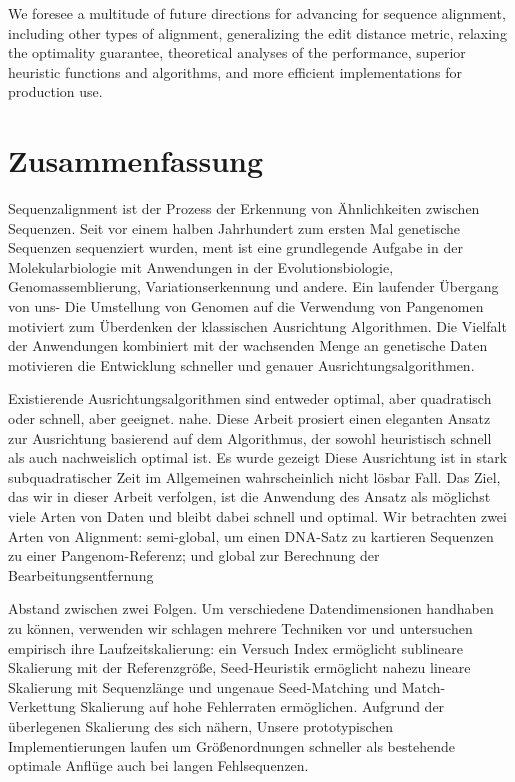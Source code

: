 We foresee a multitude of future directions for advancing \A for sequence
alignment, including other types of alignment, generalizing the edit distance
metric, relaxing the optimality guarantee, theoretical analyses of the
performance, superior heuristic functions and algorithms, and more efficient
implementations for production use.

\endgroup

\cleardoublepage%

\begingroup
\let\clearpage\relax
\let\cleardoublepage\relax
\let\cleardoublepage\relax

\chapter*{Zusammenfassung}

Sequenzalignment ist der Prozess der Erkennung von Ähnlichkeiten zwischen
Sequenzen. Seit vor einem halben Jahrhundert zum ersten Mal genetische Sequenzen
sequenziert wurden, ment ist eine grundlegende Aufgabe in der Molekularbiologie
mit Anwendungen in der Evolutionsbiologie, Genomassemblierung,
Variationserkennung und andere. Ein laufender Übergang von uns- Die Umstellung
von Genomen auf die Verwendung von Pangenomen motiviert zum Überdenken der
klassischen Ausrichtung Algorithmen. Die Vielfalt der Anwendungen kombiniert mit
der wachsenden Menge an genetische Daten motivieren die Entwicklung schneller
und genauer Ausrichtungsalgorithmen.

Existierende Ausrichtungsalgorithmen sind entweder optimal, aber quadratisch
oder schnell, aber geeignet. nahe. Diese Arbeit prosiert einen eleganten Ansatz
zur Ausrichtung basierend auf dem \A Algorithmus, der sowohl heuristisch schnell
als auch nachweislich optimal ist. Es wurde gezeigt Diese Ausrichtung ist in
stark subquadratischer Zeit im Allgemeinen wahrscheinlich nicht lösbar Fall. Das
Ziel, das wir in dieser Arbeit verfolgen, ist die Anwendung des \A Ansatz als
möglichst viele Arten von Daten und bleibt dabei schnell und optimal. Wir
betrachten zwei Arten von Alignment: semi-global, um einen DNA-Satz zu kartieren
Sequenzen zu einer Pangenom-Referenz; und global zur Berechnung der
Bearbeitungsentfernung

Abstand zwischen zwei Folgen. Um verschiedene Datendimensionen handhaben zu
können, verwenden wir schlagen mehrere Techniken vor und untersuchen empirisch
ihre Laufzeitskalierung: ein Versuch Index ermöglicht sublineare Skalierung mit
der Referenzgröße, Seed-Heuristik ermöglicht nahezu lineare Skalierung mit
Sequenzlänge und ungenaue Seed-Matching und Match-Verkettung Skalierung auf hohe
Fehlerraten ermöglichen. Aufgrund der überlegenen Skalierung des \A sich nähern,
Unsere prototypischen Implementierungen laufen um Größenordnungen schneller als
bestehende optimale Anflüge auch bei langen Fehlsequenzen.

